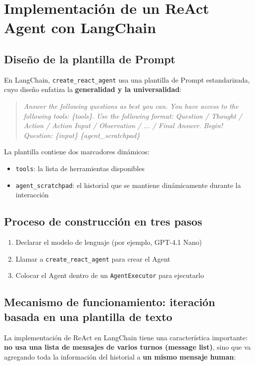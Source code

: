 \section{Implementación de un ReAct Agent con LangChain}

\subsection{Diseño de la plantilla de Prompt}

En LangChain, \texttt{create\_react\_agent} usa una plantilla de Prompt estandarizada, cuyo diseño enfatiza la \textbf{generalidad y la universalidad}:

\begin{quote}
\textit{Answer the following questions as best you can. You have access to the following tools: \{tools\}. Use the following format: Question / Thought / Action / Action Input / Observation / ... / Final Answer. Begin! Question: \{input\} \{agent\_scratchpad\}}
\end{quote}

La plantilla contiene dos marcadores dinámicos:
\begin{itemize}
    \item \texttt{tools}: la lista de herramientas disponibles
    \item \texttt{agent\_scratchpad}: el historial que se mantiene dinámicamente durante la interacción
\end{itemize}

\subsection{Proceso de construcción en tres pasos}

\begin{enumerate}
    \item Declarar el modelo de lenguaje (por ejemplo, GPT-4.1 Nano)
    \item Llamar a \texttt{create\_react\_agent} para crear el Agent
    \item Colocar el Agent dentro de un \texttt{AgentExecutor} para ejecutarlo
\end{enumerate}

\subsection{Mecanismo de funcionamiento: iteración basada en una plantilla de texto}

La implementación de ReAct en LangChain tiene una característica importante: \textbf{no usa una lista de mensajes de varios turnos (message list)}, sino que va agregando toda la información del historial a \textbf{un mismo mensaje human}:

